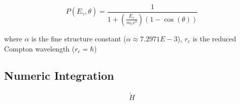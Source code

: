 \documentclass{article}
\numberwithin{equation}{subsection}
\begin{document}
\begin{equation}\label{klein_nishina2}
P(E_\gamma, \theta) = \frac{1}{1 + (\frac{E_\gamma}{m_e c^2})(1-\cos(\theta))}
\end{equation}


\noindent
where $\alpha$ is the fine structure constant ($\alpha \approx 7.2971E-3$), $r_c$ is the reduced Compton wavelength ($r_c = \hbar$)

\subsection{Numeric Integration}

\begin{equation}
\tilde{H}
\end{equation}
\end{document}
